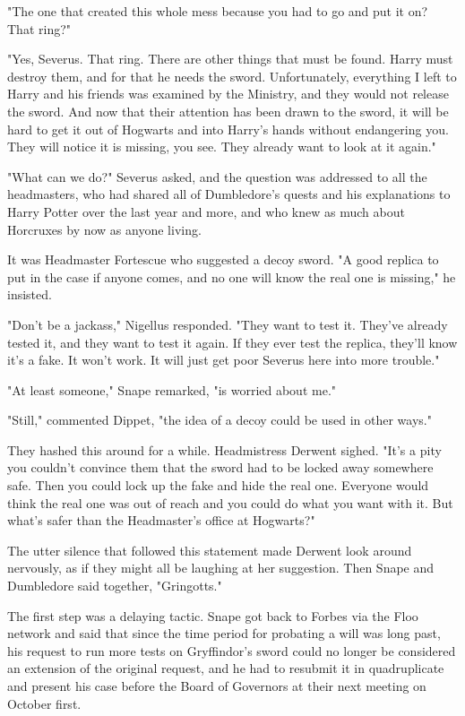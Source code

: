 \documentclass[a4paper,11pt]{article}
\begin{document}
"The one that created this whole mess because you had to go and put it on? That ring?"

"Yes, Severus. That ring. There are other things that must be found. Harry must destroy them, and for that he needs the sword. Unfortunately, everything I left to Harry and his friends was examined by the Ministry, and they would not release the sword. And now that their attention has been drawn to the sword, it will be hard to get it out of Hogwarts and into Harry's hands without endangering you. They will notice it is missing, you see. They already want to look at it again."

"What can we do?" Severus asked, and the question was addressed to all the headmasters, who had shared all of Dumbledore's quests and his explanations to Harry Potter over the last year and more, and who knew as much about Horcruxes by now as anyone living.

It was Headmaster Fortescue who suggested a decoy sword. "A good replica to put in the case if anyone comes, and no one will know the real one is missing," he insisted.

"Don't be a jackass," Nigellus responded. "They want to test it. They've already tested it, and they want to test it again. If they ever test the replica, they'll know it's a fake. It won't work. It will just get poor Severus here into more trouble."

"At least someone," Snape remarked, "is worried about me."

"Still," commented Dippet, "the idea of a decoy could be used in other ways."

They hashed this around for a while. Headmistress Derwent sighed. "It's a pity you couldn't convince them that the sword had to be locked away somewhere safe. Then you could lock up the fake and hide the real one. Everyone would think the real one was out of reach and you could do what you want with it. But what's safer than the Headmaster's office at Hogwarts?"

The utter silence that followed this statement made Derwent look around nervously, as if they might all be laughing at her suggestion. Then Snape and Dumbledore said together, "Gringotts."

The first step was a delaying tactic. Snape got back to Forbes via the Floo network and said that since the time period for probating a will was long past, his request to run more tests on Gryffindor's sword could no longer be considered an extension of the original request, and he had to resubmit it in quadruplicate and present his case before the Board of Governors at their next meeting on October first.
\end{document}

